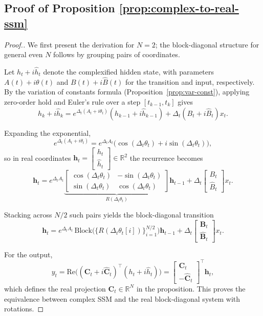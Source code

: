 \documentclass{article}
\def\vh{{\bm{h}}}
\def\bB{{\bm{B}}}
\def\bC{{\bm{C}}}
\theoremstyle{plain}
\theoremstyle{definition}
\theoremstyle{remark}
\begin{document}
\subsection{Proof of Proposition \ref{prop:complex-to-real-ssm}}
\label{app:proof-complex-to-real-ssm}
\PropComplexRealSSM*
\begin{proof}[Proof.]
We first present the derivation for $N=2$; the block-diagonal structure for general even $N$ follows by grouping pairs of coordinates.

Let $h_t + i\hat{h}_t$ denote the complexified hidden state, with parameters 
$A(t)+i\theta(t)$ and $B(t)+i\hat{B}(t)$ for the transition and input, respectively.  
By the variation of constants formula (Proposition~\ref{prop:var-const}), applying zero-order hold and Euler's rule over a step $[t_{k-1},t_k]$ gives
\[
h_k + i\hat{h}_k 
= e^{\Delta_t (A_t + i\theta_t)}(h_{k-1}+ i\hat{h}_{k-1})
+ \Delta_t (B_t + i\hat{B}_t)x_t.
\]

Expanding the exponential,
\[
e^{\Delta_t(A_t+i\theta_t)} 
= e^{\Delta_t A_t}\Big(\cos(\Delta_t\theta_t)+i\sin(\Delta_t\theta_t)\Big),
\]
so in real coordinates $\vh_t=\begin{bmatrix}h_t \\ \hat{h}_t\end{bmatrix}\in\mathbb{R}^2$ the recurrence becomes
\[
\vh_t
= e^{\Delta_t A_t}
\underbrace{\begin{bmatrix}
    \cos(\Delta_t\theta_t) & -\sin(\Delta_t\theta_t) \\
    \sin(\Delta_t\theta_t) & \cos(\Delta_t\theta_t)
\end{bmatrix}}_{R(\Delta_t\theta_t)}
\vh_{t-1}
+ \Delta_t
\begin{bmatrix}
B_t \\ \hat{B}_t
\end{bmatrix}x_t.
\]

Stacking across $N/2$ such pairs yields the block-diagonal transition
\[
\vh_t
= e^{\Delta_t A_t}\,\mathrm{Block}\big(\{R(\Delta_t\theta_t[i])\}_{i=1}^{N/2}\big)\vh_{t-1}
+ \Delta_t\begin{bmatrix}\bB_t \\ \hat{\bB}_t\end{bmatrix}x_t.
\]

For the output, 
\[
y_t = \mathrm{Re}\Big((\bC_t+i\hat{\bC}_t)^\top(h_t+i\hat{h}_t)\Big)
= \begin{bmatrix}\bC_t \\ -\hat{\bC}_t\end{bmatrix}^\top \vh_t,
\]
which defines the real projection $\bC_t\in\mathbb{R}^N$ in the proposition.
This proves the equivalence between complex SSM and the real block-diagonal system with rotations.
\end{proof}
\end{document}
